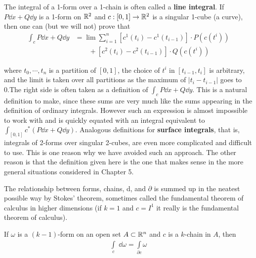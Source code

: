 The integral of a 1-form over a 1-chain is often called a \textbf{line integral}. 
If $P\dd x + Q\dd y$ is a 1-form on $\mathbb{R}^2$ and $c:[0,1]\to\mathbb{R}^2$
is a singular 1-cube (a curve), then one can (but we will not) prove that
\begin{align*}
    \int_c P\dd x+Q\dd y
    & = \lim\sum_{i=1}^n\left[c^1(t_i)-c^1(t_{i-1})\right]\cdot P(c(t^i)) \\
    & \qquad + \left[c^2(t_i)-c^2(t_{i-1})\right]\cdot Q(c(t^i))
\end{align*}

where $t_0,\cdots,t_n$ is a partition of $[0,1]$, the choice of $t^i$ in
$[t_{i-1},t_i]$ is arbitrary, and the limit is taken over all partitions
as the maximum of $|t_i-t_{i-1}|$ goes to 0.The right side is often taken as a definition 
of $\int_c P \dd x + Q \dd y$. This is a natural definition to make, since these sums are 
very much like the sums appearing in the definition of ordinary integrals. However such an 
expression is almost impossible to work with and is quickly equated with an integral equivalent 
to $\int_{[0,1]}c^*(P \dd x+ Q \dd y)$. Analogous definitions for \textbf{surface integrals}, that
is, integrals of 2-forms over singular 2-cubes, are even more complicated and difficult to use.
This is one reason why we have avoided such an approach. The other reason is that the definition 
given here is the one that makes sense in the more general situations considered in Chapter 5.

The relationship between forms, chains, d, and $\partial$ is summed up in the neatest possible way 
by Stokes' theorem, sometimes called the fundamental theorem of calculus in higher dimensions 
(if $k = 1$ and $c = I^1$ it really is the fundamental theorem of calculus).

\begin{theorem}
    If $\omega$ is a $(k-1 )$-form on an open set $A\subset\mathbb{R}^n$ and $c$ is a $k$-chain in $A$, then
    \begin{align*}
        \int\limits_c\;\dd\omega=\int\limits_{\partial c}\omega
    \end{align*}
\end{theorem}

